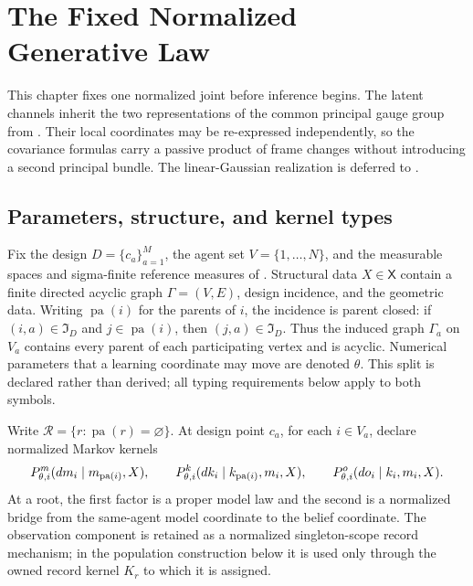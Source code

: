 \chapter[The Fixed Normalized Generative Law]{The Fixed Normalized\\Generative Law}
\label{ch:generative}

This chapter fixes one normalized joint before inference begins. The latent
channels inherit the two representations of the common principal gauge group
from . Their local coordinates may be re-expressed
independently, so the covariance formulas carry a passive product of frame
changes without introducing a second principal bundle. The linear-Gaussian
realization is deferred to .

\section{Parameters, structure, and kernel types}
\label{sec:gen-typing-setup}

Fix the design $D=\{c_a\}_{a=1}^{M}$, the agent set $V=\{1,\dots,N\}$, and the measurable spaces
and sigma-finite reference measures of .  Structural data
$X\in\mathsf X$ contain a finite directed acyclic graph $\Gamma=(V,E)$, design incidence, and the
geometric data. Writing $\operatorname{pa}(i)$ for the parents of $i$, the incidence is parent
closed: if $(i,a)\in\mathfrak I_D$ and $j\in\operatorname{pa}(i)$, then $(j,a)\in\mathfrak I_D$. Thus the induced graph
$\Gamma_a$ on $V_a$ contains every parent of each participating vertex and is acyclic. Numerical
parameters that a learning coordinate may move are denoted $\theta$. This split is declared rather
than derived; all typing requirements below apply to both symbols.
\label{def:gen-parameter-split}

Write $\mathcal R=\{r:\operatorname{pa}(r)=\varnothing\}$. At design point $c_a$, for each $i\in V_a$, declare normalized
Markov kernels
\begin{equation}
P_{\theta,i}^{m}(dm_i\mid m_{\operatorname{pa}(i)},X),
\qquad
P_{\theta,i}^{k}(dk_i\mid k_{\operatorname{pa}(i)},m_i,X),
\qquad
P_{\theta,i}^{o}(do_i\mid k_i,m_i,X).
\label{eq:gen-kernels}
\end{equation}
At a root, the first factor is a proper model law and the second is a normalized bridge from the
same-agent model coordinate to the belief coordinate. The observation component is retained as a
normalized singleton-scope record mechanism; in the population construction below it is used only
through the owned record kernel $K_r$ to which it is assigned. 

